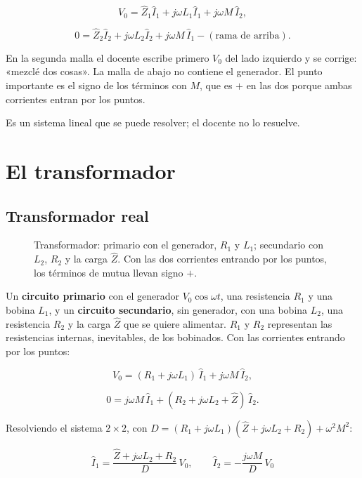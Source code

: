 \documentclass[12pt,a4paper]{article}
\begin{document}
\[
V_0 = \hat Z_1\hat I_1 + j\omega L_1\hat I_1 + j\omega M\,\hat I_2,
\]

\[
0 = \hat Z_2\hat I_2 + j\omega L_2\hat I_2 + j\omega M\,\hat I_1 - (\text{rama de arriba}).
\]

\begin{notebox}
En la segunda malla el docente escribe primero $V_0$ del lado izquierdo y se
corrige: «mezclé dos cosas». La malla de abajo no contiene el generador. El
punto importante es el signo de los términos con $M$, que es $+$ en las dos
porque ambas corrientes entran por los puntos.
\end{notebox}

Es un sistema lineal que se puede resolver; el docente no lo resuelve.

\section{El transformador}

\subsection{Transformador real}

\begin{figure}[H]
  \centering
  
  \caption{Transformador: primario con el generador, $R_1$ y $L_1$; secundario con $L_2$, $R_2$ y la carga $\hat Z$. Con las dos corrientes entrando por los puntos, los términos de mutua llevan signo $+$.}
\end{figure}

Un \textbf{circuito primario} con el generador $V_0\cos\omega t$, una resistencia
$R_1$ y una bobina $L_1$, y un \textbf{circuito secundario}, sin generador, con una
bobina $L_2$, una resistencia $R_2$ y la carga $\hat Z$ que se quiere
alimentar. $R_1$ y $R_2$ representan las resistencias internas, inevitables, de
los bobinados. Con las corrientes entrando por los puntos:

\[
V_0 = (R_1 + j\omega L_1)\,\hat I_1 + j\omega M\,\hat I_2,
\]

\[
0 = j\omega M\,\hat I_1 + (R_2 + j\omega L_2 + \hat Z)\,\hat I_2 .
\]

Resolviendo el sistema $2\times2$, con
$D = (R_1 + j\omega L_1)(\hat Z + j\omega L_2 + R_2) + \omega^2M^2$:

\begin{keybox}
\[
\boxed{\ \hat I_1 = \frac{\hat Z + j\omega L_2 + R_2}{D}\,V_0,
\qquad
\hat I_2 = -\frac{j\omega M}{D}\,V_0\ }
\]
\end{keybox}
\end{document}
